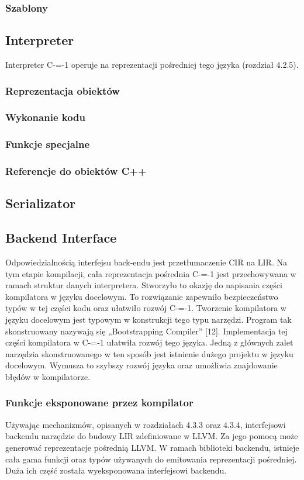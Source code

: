 \subsubsection{Szablony}

\subsection{Interpreter}
Interpreter C-=-1 operuje na reprezentacji pośredniej tego języka (rozdział 4.2.5).
\subsubsection{Reprezentacja obiektów}
\subsubsection{Wykonanie kodu}
\subsubsection{Funkcje specjalne}
\subsubsection{Referencje do obiektów C++}
\subsection{Serializator}
\subsection{Backend Interface}
\label{Backend_Interface}
Odpowiedzialnością interfejsu back-endu jest przetłumaczenie CIR na LIR. Na tym etapie kompilacji, cała reprezentacja pośrednia C-=-1 jest przechowywana w ramach struktur danych interpretera. Stworzyło to okazję do napisania części kompilatora w języku docelowym.
To rozwiązanie zapewniło bezpieczeństwo typów w tej części kodu oraz ułatwiło rozwój C-=-1. Tworzenie kompilatora w języku docelowym jest typowym w konstrukcji tego typu narzędzi. Program tak skonstruowany nazywają się „Bootstrapping Compiler” [12]. 
Implementacja tej części kompilatora w C-=-1 ułatwiła rozwój tego języka. Jedną z głównych zalet narzędzia skonstruowanego w ten sposób jest istnienie dużego projektu w języku docelowym. Wymusza to szybszy rozwój języka oraz umożliwia znajdowanie błędów w kompilatorze.
\subsubsection{Funkcje eksponowane przez kompilator}
Używając mechanizmów, opisanych w rozdziałach 4.3.3 oraz 4.3.4, interfejsowi backendu narzędzie do budowy LIR zdefiniowane w LLVM. Za jego pomocą może generować reprezentacje pośrednią LLVM.
W ramach biblioteki backendu, istnieje cała gama funkcji oraz typów używanych do emitowania reprezentacji pośredniej. Duża ich część została wyeksponowana interfejsowi backendu.
